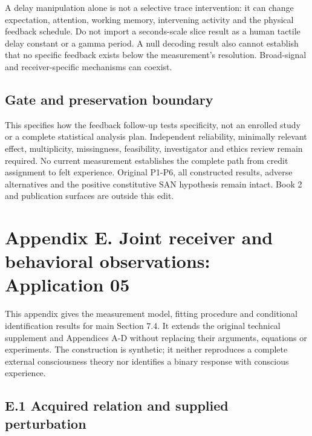 \documentclass[
  american,
  11pt,
  letterpaper,
]{article}
\begin{document}
A delay manipulation alone is not a selective trace intervention: it can change expectation, attention, working memory, intervening activity and the physical feedback schedule. Do not import a seconds-scale slice result as a human tactile delay constant or a gamma period. A null decoding result also cannot establish that no specific feedback exists below the measurement's resolution. Broad-signal and receiver-specific mechanisms can coexist.

\subsection{Gate and preservation boundary}\label{gate-and-preservation-boundary}

This specifies how the feedback follow-up tests specificity, not an enrolled study or a complete statistical analysis plan. Independent reliability, minimally relevant effect, multiplicity, missingness, feasibility, investigator and ethics review remain required. No current measurement establishes the complete path from credit assignment to felt experience. Original P1-P6, all constructed results, adverse alternatives and the positive constitutive SAN hypothesis remain intact. Book 2 and publication surfaces are outside this edit.

\clearpage
\begingroup\setlength{\parskip}{2pt plus 1pt minus 1pt}
\hypertarget{appendix-e}{}

\section{Appendix E. Joint receiver and behavioral observations: Application 05}\label{appendix-e.-joint-receiver-and-behavioral-observations-application-05}

This appendix gives the measurement model, fitting procedure and conditional identification results for main Section 7.4. It extends the original technical supplement and Appendices A-D without replacing their arguments, equations or experiments. The construction is synthetic; it neither reproduces a complete external consciousness theory nor identifies a binary response with conscious experience.

\subsection{E.1 Acquired relation and supplied perturbation}\label{e.1-acquired-relation-and-supplied-perturbation}
\end{document}
